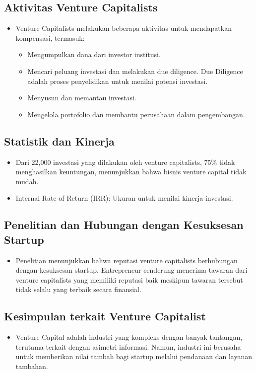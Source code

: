\documentclass{article}
\begin{document}
\subsection{Aktivitas Venture Capitalists}
\begin{itemize}
    \item Venture Capitalists melakukan beberapa aktivitas untuk mendapatkan kompensasi, termasuk:
          \begin{itemize}
              \item Mengumpulkan dana dari investor institusi.
              \item Mencari peluang investasi dan melakukan due diligence. Due Diligence adalah proses penyelidikan untuk menilai potensi investasi.
              \item Menyusun dan memantau investasi.
              \item Mengelola portofolio dan membantu perusahaan dalam pengembangan.
          \end{itemize}
\end{itemize}

\subsection{Statistik dan Kinerja}
\begin{itemize}
    \item Dari 22,000 investasi yang dilakukan oleh venture capitalists, 75\% tidak menghasilkan keuntungan, menunjukkan bahwa bisnis venture capital tidak mudah.
    \item Internal Rate of Return (IRR): Ukuran untuk menilai kinerja investasi.
\end{itemize}

\subsection{Penelitian dan Hubungan dengan Kesuksesan Startup}
\begin{itemize}
    \item Penelitian menunjukkan bahwa reputasi venture capitalists berhubungan dengan kesuksesan startup. Entrepreneur cenderung menerima tawaran dari venture capitalists yang memiliki reputasi baik meskipun tawaran tersebut tidak selalu yang terbaik secara finansial.
\end{itemize}

\subsection{Kesimpulan terkait Venture Capitalist}
\begin{itemize}
    \item Venture Capital adalah industri yang kompleks dengan banyak tantangan, terutama terkait dengan asimetri informasi. Namun, industri ini berusaha untuk memberikan nilai tambah bagi startup melalui pendanaan dan layanan tambahan.
\end{itemize}
\end{document}
